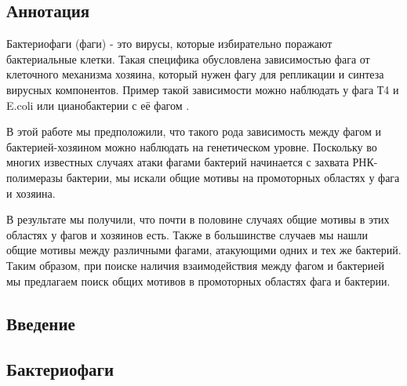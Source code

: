 \documentclass[14pt]{extarticle}
\begin{document}
%


\begin{center}
\item \section{Аннотация}
\end{center}

\par{Бактериофаги (фаги) - это вирусы, которые избирательно поражают бактериальные клетки. Такая специфика обусловлена
зависимостью фага от клеточного механизма хозяина, который нужен фагу для репликации и синтеза вирусных компонентов.
Пример такой зависимости можно наблюдать у фага Т4 и E.coli \cite{hinton} или цианобактерии с её фагом 
\cite{puxty-evanx}.}

\par{В этой работе мы предположили, что такого рода зависимость между фагом и бактерией-хозяином можно 
наблюдать на генетическом уровне. Поскольку во многих известных случаях атаки фагами бактерий начинается с захвата 
РНК-полимеразы бактерии, мы искали общие мотивы на промоторных областях у фага и хозяина.}

\par{ В результате мы получили, что почти в половине случаях общие мотивы в этих областях у фагов и хозяинов есть. Также
в большинстве случаев мы нашли общие мотивы между различными фагами, атакующими одних и тех же бактерий. Таким образом, 
при поиске наличия взаимодействия между фагом и бактерией мы предлагаем поиск общих мотивов в промоторных областях фага 
и бактерии.}


\newpage
\tableofcontents

\newpage
\begin{center}
\item \section{Введение}
\end{center}

    \begin{center}
    \item \subsection{Бактериофаги}
    \end{center}
    
\end{document}
